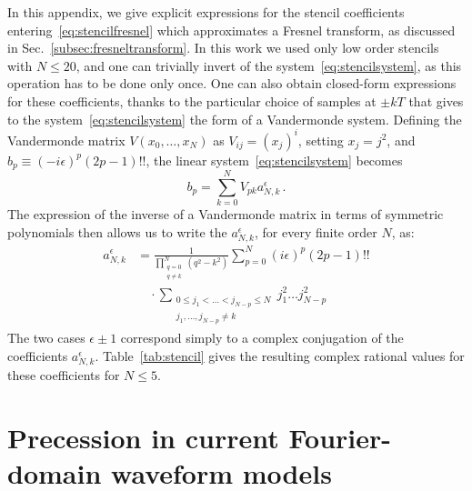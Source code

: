 \documentclass[aps,showpacs,twocolumn,
prd,superscriptaddress,nofootinbib]{revtex4-1}
\newcommand{\be}{\begin{equation}}
\newcommand{\ee}{\end{equation}}
\newcommand{\nn}{\nonumber}
\newcommand{\jgb}[1]{{\color{DarkGreen} #1}}
\begin{document}
In this appendix, we give explicit expressions for the stencil coefficients entering~\eqref{eq:stencilfresnel} \jgb{which approximates a Fresnel transform, as discussed in Sec.~\ref{subsec:fresneltransform}}. In this work we used only low order stencils with $N\leq 20$, and one can trivially invert of the system~\eqref{eq:stencilsystem}, as this operation has to be done only once. One can also obtain closed-form expressions for these coefficients, thanks to the particular choice of samples at $\pm kT$ that gives to the system~\eqref{eq:stencilsystem} the form of a Vandermonde system. Defining the Vandermonde matrix $V(x_{0},\dots,x_{N})$ as $V_{ij} = (x_{j})^{i}$, setting $x_{j} = j^{2}$, and $b_{p} \equiv (-i\epsilon)^{p}(2p-1)!!$, the linear system~\eqref{eq:stencilsystem} becomes
\be
	b_{p} = \sum\limits_{k=0}^{N} V_{pk} a_{N,k}^{\epsilon} \,.
\ee
The expression of the inverse of a Vandermonde matrix in terms of symmetric polynomials then allows us to write the $a_{N,k}^{\epsilon}$, for every finite order $N$, as:
\begin{align}
	a_{N,k}^{\epsilon} &= \frac{1}{\prod\limits_{\substack{q=0 \\ q\neq k}}^{N} (q^{2}-k^{2})} \sum\limits_{p=0}^{N} (i\epsilon)^{p}(2p-1)!! \nn\\ & \quad \cdot \sum\limits_{\substack{ 0 \leq j_{1} < \dots < j_{N-p} \leq N \\ j_{1}, \dots, j_{N-p} \neq k}} j_{1}^{2}\dots j_{N-p}^{2}
\end{align}
The two cases $\epsilon\pm 1$ correspond simply to a complex conjugation of the coefficients $a_{N,k}^{\epsilon}$. Table~\ref{tab:stencil} gives the resulting complex rational values for these coefficients for $N\leq 5$.

\section{Precession in current Fourier-domain waveform models}
\label{app:precpreviousapproaches}
\end{document}
